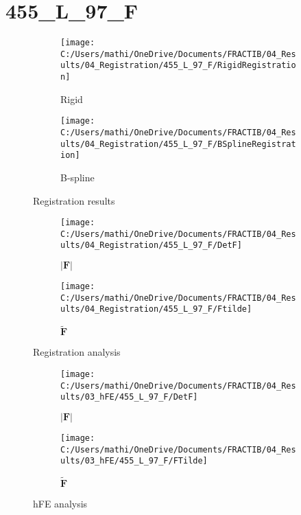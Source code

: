 \documentclass{article}%
\begin{document}
%
\newpage%
\section*{455\_L\_97\_F}%
\label{sec:455L97F}%


\begin{figure}[h!]%
\begin{subfigure}[b]{0.5\linewidth}%
\texttt{[image: C:/Users/mathi/OneDrive/Documents/FRACTIB/04\_Results/04\_Registration/455\_L\_97\_F/RigidRegistration]}%
\caption{Rigid}%
\end{subfigure}%
\begin{subfigure}[b]{0.5\linewidth}%
\texttt{[image: C:/Users/mathi/OneDrive/Documents/FRACTIB/04\_Results/04\_Registration/455\_L\_97\_F/BSplineRegistration]}%
\caption{B{-}spline}%
\end{subfigure}%
\caption{Registration results}%
\end{figure}

%


\begin{figure}[h!]%
\begin{subfigure}[b]{0.5\linewidth}%
\texttt{[image: C:/Users/mathi/OneDrive/Documents/FRACTIB/04\_Results/04\_Registration/455\_L\_97\_F/DetF]}%
\caption{$|\mathbf{F}|$}%
\end{subfigure}%
\begin{subfigure}[b]{0.5\linewidth}%
\texttt{[image: C:/Users/mathi/OneDrive/Documents/FRACTIB/04\_Results/04\_Registration/455\_L\_97\_F/Ftilde]}%
\caption{$\tilde{\mathbf{F}}$}%
\end{subfigure}%
\caption{Registration analysis}%
\end{figure}

%


\begin{figure}[h!]%
\begin{subfigure}[b]{0.5\linewidth}%
\texttt{[image: C:/Users/mathi/OneDrive/Documents/FRACTIB/04\_Results/03\_hFE/455\_L\_97\_F/DetF]}%
\caption{$|\mathbf{F}|$}%
\end{subfigure}%
\begin{subfigure}[b]{0.5\linewidth}%
\texttt{[image: C:/Users/mathi/OneDrive/Documents/FRACTIB/04\_Results/03\_hFE/455\_L\_97\_F/FTilde]}%
\caption{$\tilde{\mathbf{F}}$}%
\end{subfigure}%
\caption{hFE analysis}%
\end{figure}
\end{document}
